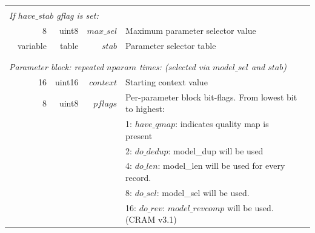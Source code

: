 \documentclass[a4paper]{article}
\begin{document}
\begin{table}
\begin{tabular}{|r|r|r|r|r|p{8cm}|l|l|}
\multicolumn{8}{|l|}{}\\[-0.5em]
\multicolumn{8}{|l|}{\textit{If $have\_stab$ gflag is set:} }                                                                                                                                 \\ 
\cline{2-7}
                       & \multicolumn{2}{r|}{8}        & uint8          & $max\_sel$                     & \multicolumn{2}{p{8.4cm}|}{Maximum parameter selector value} & \\
                       & \multicolumn{2}{r|}{variable} & table          & $stab$                         & \multicolumn{2}{p{8.4cm}|}{Parameter selector table} & \\
\cline{2-7}
\multicolumn{8}{|l|}{}\\
\hline
\hline
\multicolumn{8}{|l|}{}\\[-0.7em]
\multicolumn{8}{|l|}{\textit{Parameter block: repeated $nparam$ times: (selected via $model\_sel$ and $stab$)}} \\ 
\cline{2-7}
                       & \multicolumn{2}{r|}{16}        & uint16        & $context$                      & \multicolumn{2}{p{8.4cm}|}{Starting context value} & \\
\cline{2-7}
                       & \multicolumn{2}{r|}{8}        & uint8          & $pflags$                       & \multicolumn{2}{p{8.4cm}|}{Per-parameter block bit-flags. From lowest bit to highest:} & \\
                       & \multicolumn{2}{r|}{}         &                &                                & \multicolumn{2}{p{8.4cm}|}{1: $have\_qmap$: indicates quality map is present} & \\
                       & \multicolumn{2}{r|}{}         &                &                                & \multicolumn{2}{p{8.4cm}|}{2: $do\_dedup$: model\_dup will be used} & \\
                       & \multicolumn{2}{r|}{}         &                &                                & \multicolumn{2}{p{8.4cm}|}{4: $do\_len$: model\_len will be used for every record.} & \\
                       & \multicolumn{2}{r|}{}         &                &                                & \multicolumn{2}{p{8.4cm}|}{8: $do\_sel$: model\_sel will be used.} & \\
                       & \multicolumn{2}{r|}{}         &                &                                & \multicolumn{2}{p{8.4cm}|}{16: $do\_rev$: $model\_revcomp$ will be used. (CRAM v3.1)} & \\

\end{tabular}
\end{table}
\end{document}
